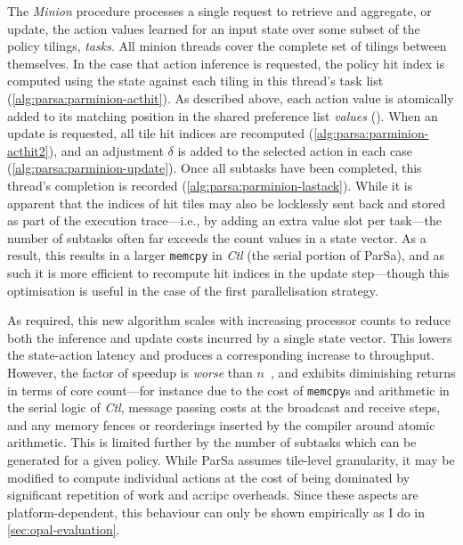 The \emph{Minion} procedure processes a single request to retrieve and aggregate, or update, the action values learned for an input state over some subset of the policy tilings, \emph{tasks}.
All minion threads cover the complete set of tilings between themselves.
In the case that action inference is requested, the policy hit index is computed using the state against each tiling in this thread's task list (\cref{alg:parsa:parminion-acthit}).
As described above, each action value is atomically added to its matching position in the shared preference list \emph{values} ().
When an update is requested, all tile hit indices are recomputed (\cref{alg:parsa:parminion-acthit2}), and an adjustment $\delta$ is added to the selected action in each case (\cref{alg:parsa:parminion-update}).
Once all subtasks have been completed, this thread's completion is recorded (\cref{alg:parsa:parminion-lastack}).
While it is apparent that the indices of hit tiles may also be locklessly sent back and stored as part of the execution trace---i.e., by adding an extra value slot per task---the number of subtasks often far exceeds the count values in a state vector.
As a result, this results in a larger \texttt{memcpy} in \emph{Ctl} (the serial portion of ParSa), and as such it is more efficient to recompute hit indices in the update step---though this optimisation is useful in the case of the first parallelisation strategy.

As required, this new algorithm scales with increasing processor counts to reduce both the inference and update costs incurred by a single state vector.
This lowers the state-action latency and produces a corresponding increase to throughput.
However, the factor of speedup is \emph{worse} than $n$~\unit{\times}, and exhibits diminishing returns in terms of core count---for instance due to the cost of \texttt{memcpy}s and arithmetic in the serial logic of \emph{Ctl}, message passing costs at the broadcast and receive steps, and any memory fences or reorderings inserted by the compiler around atomic arithmetic.
This is limited further by the number of subtasks which can be generated for a given policy.
While ParSa assumes tile-level granularity, it may be modified to compute individual actions at the cost of being dominated by significant repetition of work and \gls{acr:ipc} overheads.
Since these aspects are platform-dependent, this behaviour can only be shown empirically as I do in \cref{sec:opal-evaluation}.